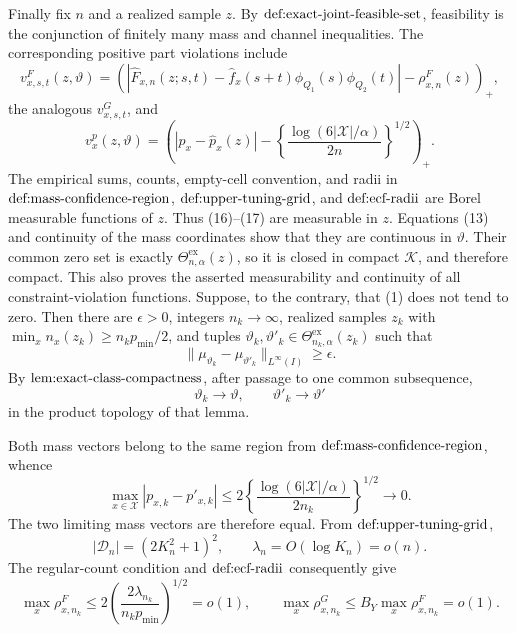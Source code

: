 Finally fix \(n\) and a realized sample \(z\).  By
\(\textnormal{def:exact-joint-feasible-set}\), feasibility is the conjunction
of finitely many mass and channel inequalities.  The corresponding positive
part violations include
\[
 v^F_{x,s,t}(z,\vartheta)
 =\left(
 \left|\widehat F_{x,n}(z;s,t)
       -\widehat f_x(s+t)\phi_{Q_1}(s)\phi_{Q_2}(t)\right|
       -\rho^F_{x,n}(z)
 \right)_+,                                                     \tag{16}
\]
the analogous \(v^G_{x,s,t}\), and
\[
 v^p_x(z,\vartheta)
 =\left(
 |p_x-\widehat p_x(z)|
 -\left\{\frac{\log(6|\mathcal X|/\alpha)}{2n}\right\}^{1/2}
 \right)_+.                                                     \tag{17}
\]
The empirical sums, counts, empty-cell convention, and radii in
\(\textnormal{def:mass-confidence-region}\),
\(\textnormal{def:upper-tuning-grid}\), and
\(\textnormal{def:ecf-radii}\) are Borel measurable functions of \(z\).
Thus (16)--(17) are measurable in \(z\).  Equations (13) and continuity of
the mass coordinates show that they are continuous in \(\vartheta\).  Their
common zero set is exactly \(\Theta^{\mathrm{ex}}_{n,\alpha}(z)\), so it is
closed in compact \(\mathscr K\), and therefore compact.  This also proves
the asserted measurability and continuity of all constraint-violation
functions.
Suppose, to the contrary, that (1) does not tend to zero.  Then there are
\(\epsilon>0\), integers \(n_k\to\infty\), realized samples \(z_k\) with
\(\min_x n_x(z_k)\ge n_kp_{\min}/2\), and tuples
\(\vartheta_k,\vartheta'_k\in
\Theta^{\mathrm{ex}}_{n_k,\alpha}(z_k)\) such that
\[
 \|\mu_{\vartheta_k}-\mu_{\vartheta'_k}\|_{L^\infty(I)}
 \ge\epsilon.                                                    \tag{2}
\]
By \(\textnormal{lem:exact-class-compactness}\), after passage to one common
subsequence,
\[
 \vartheta_k\longrightarrow\vartheta,
 \qquad
 \vartheta'_k\longrightarrow\vartheta'                           \tag{3}
\]
in the product topology of that lemma.

Both mass vectors belong to the same region from
\(\textnormal{def:mass-confidence-region}\), whence
\[
 \max_{x\in\mathcal X}|p_{x,k}-p'_{x,k}|
 \le2\left\{\frac{\log(6|\mathcal X|/\alpha)}{2n_k}\right\}^{1/2}
 \longrightarrow0.                                                \tag{4}
\]
The two limiting mass vectors are therefore equal.  From
\(\textnormal{def:upper-tuning-grid}\),
\[
 |\mathcal D_n|=(2K_n^2+1)^2,
 \qquad
 \lambda_n=O(\log K_n)=o(n).                                     \tag{5}
\]
The regular-count condition and \(\textnormal{def:ecf-radii}\) consequently
give
\[
 \max_x\rho^F_{x,n_k}
 \le2\left(\frac{2\lambda_{n_k}}{n_kp_{\min}}\right)^{1/2}=o(1),
 \qquad
 \max_x\rho^G_{x,n_k}
 \le B_Y\max_x\rho^F_{x,n_k}=o(1).                              \tag{6}
\]

